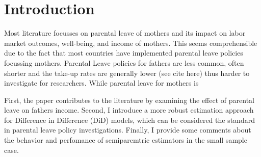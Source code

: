 \section{Introduction}




Most literature focusses on parental leave of mothers and its impact on labor market outcomes, well-being, and income of mothers.
This seems comprehensible due to the fact that most countries have implemented parental leave policies focussing mothers.
Parental Leave policies for fathers are less common, often shorter and the take-up rates are generally lower (see cite here) thus harder to investigate for researchers.
While parental leave for mothers is


First, the paper contributes to the literature by examining the effect of parental leave on fathers income.
Second, I introduce a more robust estimation approach for Difference in Difference (DiD) models, which can be considered the standard in parental leave policy investigations.
Finally, I provide some comments about the behavior and perfomance of semiparemtric estimators in the small sample case.

